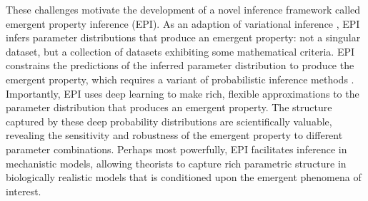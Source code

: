 \documentclass[11pt]{article}
\begin{document}

These challenges motivate the development of a novel inference framework called emergent property inference (EPI).
As an adaption of variational inference \cite{saul1998mean}, EPI infers parameter distributions that produce an emergent property: not a singular dataset, but a collection of datasets exhibiting some mathematical criteria.
EPI constrains the predictions of the inferred parameter distribution to produce the emergent property, which requires a variant of probabilistic inference methods \cite{loaiza2017maximum}.
Importantly, EPI uses deep learning to make rich, flexible approximations to the parameter distribution \cite{rezende2015variational} that produces an emergent property.
The structure captured by these deep probability distributions are scientifically valuable, revealing the sensitivity and robustness of the emergent property to different parameter combinations.
Perhaps most powerfully, EPI facilitates inference in mechanistic models, allowing theorists to capture rich parametric structure in biologically realistic models that is conditioned upon the emergent phenomena of interest.
\end{document}
